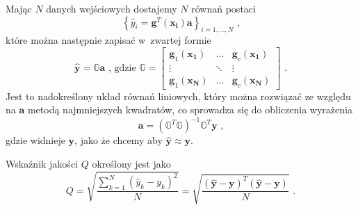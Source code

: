\documentclass[a4paper; 11pt]{article}
\begin{document}
Mając $N$ danych wejściowych dostajemy $N$ równań postaci
\begin{equation}
    \left\{ \hat{y}_i = \mathbf{g}^T(\mathbf{x_i}) \mathbf{a} \right\} _ {i = 1, \dots , N} \text{ ,}
    \label{eq:ts:yhateqs}
\end{equation}
które można następnie zapisać w~zwartej formie
\begin{equation}
    \hat{\mathbf{y}} = \mathbb{G} \mathbf{a} \text{ , gdzie }
    \mathbb{G} = \begin{bmatrix}
        \mathbf{g}_1(\mathbf{x_1}) & \dots & \mathbf{g}_c(\mathbf{x_1}) \\
        \vdots & \ddots & \vdots \\
        \mathbf{g}_1(\mathbf{x_N}) & \dots & \mathbf{g}_c(\mathbf{x_N})
    \end{bmatrix} \text{ .}
    \label{eq:ts:yhatmatrix}
\end{equation}
Jest to nadokreślony układ równań liniowych, który można rozwiązać ze względu
na $\mathbf{a}$ metodą najmniejszych kwadratów, co sprowadza się do obliczenia
wyrażenia
\begin{equation}
    \mathbf{a} = \left( \mathbb{G}^T \mathbb{G} \right)^{-1} \mathbb{G}^T \mathbf{y} \text{ ,}
    \label{eq:ts:a}
\end{equation}
gdzie widnieje $\mathbf{y}$, jako że chcemy aby $\hat{\mathbf{y}} \approx \mathbf{y}$.

Wskaźnik jakości $Q$ określony jest jako
\begin{equation}
    Q = \sqrt{ \frac{ \sum\limits_{k=1}^N {\left( \hat{y}_k - y_k \right)^2} }{N} }
    = \sqrt { \frac{ (\hat{\mathbf{y}} - \mathbf{y})^T (\hat{\mathbf{y}} - \mathbf{y}) }{N} } \text{ .}
    \label{eq:ts:Q}
\end{equation}
\end{document}
